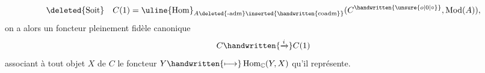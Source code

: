 \[
\deleted{\text{Soit}}\quad C(1)=\uline{\operatorname{Hom}}_{A\deleted{\text{-}\mathrm{adm}}\inserted{\handwritten{\mathrm{coadm}}}}(C^{\handwritten{\unsure{o|0|\circ}}},\operatorname{Mod}(A)),
\]
on a alors un foncteur pleinement fidèle canonique
\[
C\handwritten{\xrightarrow{i}}C(1)
\]
associant à tout objet $X$ de $C$ le foncteur $Y\handwritten{\longmapsto}\operatorname{Hom}_{\mathbb{C}}(Y,X)$ qu'il représente. 
